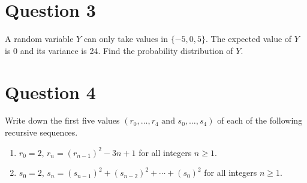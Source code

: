 \documentclass[11pt]{article}
\begin{document}
\section*{Question 3}

A random variable $Y$ can only take values in $ \{ -5, 0, 5 \}$. The expected
value of $Y$ is 0 and its variance is 24. Find the probability distribution of
$Y$.

\section*{Question 4}

Write down the first five values $(r_0, \dots, r_4 \text{ and } s_0, \dots,
s_4)$ of each of the following recursive sequences.

\begin{enumerate}[label = (\alph*)]
  \item $r_0 = 2$, $r_n = {(r_{n-1})}^2 - 3n + 1$ for all integers $n \geq 1$.

  \item $s_0 = 2$, $s_n = {(s_{n-1})}^2 + {(s_{n-2})}^2 + \cdots + {(s_0)}^2$
  for all integers $n \geq 1$.

\end{enumerate}
\end{document}

